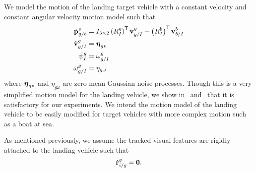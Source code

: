 We model the motion of the landing target vehicle
with a constant velocity and constant
angular velocity motion model such that
\begin{align}
  \dot{\boldsymbol{\mathrm{p}}}_{g/b}^{v} &= I_{3 \times 2} \left( R_{I}^{g} \right)^{\mathsf{T}}
   \boldsymbol{\mathrm{v}}_{g/I}^{g} - \left( R_{I}^{b} \right)^{\mathsf{T}}
  \boldsymbol{\mathrm{v}}_{b/I}^{b} \label{eq:goal_dynamics} \\
  \dot{\boldsymbol{\mathrm{v}}}_{g/I}^{g} &= \boldsymbol{\mathrm{\eta}}_{gv} \nonumber \\
  \dot{\psi}_{I}^{g} &= \omega_{g/I}^g \nonumber \\
  \dot{\omega}_{g/I}^{g} &= \eta_{g\omega} \nonumber
\end{align}
where $\boldsymbol{\mathrm{\eta}}_{gv}$ and $\eta_{g\omega}$ are zero-mean Gaussian noise
processes. Though this is a very simplified motion model for the landing
vehicle, we show in~
and~ that it is
satisfactory for our experiments. We intend the motion model of the landing
vehicle to be easily modified for target vehicles with more complex motion such
as a boat at sea.

As mentioned previously, we assume the tracked visual features are rigidly
attached to the landing vehicle such that
\begin{equation}
  \dot{\boldsymbol{\mathrm{r}}}_{i/g}^g = \boldsymbol{\mathrm{0}}. \label{eq:feature_dynamics}
\end{equation}

